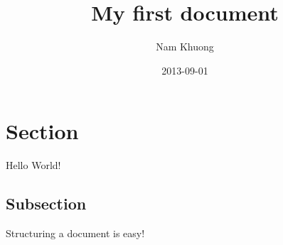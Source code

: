 \documentclass{article}
\title{My first document}
\date{2013-09-01}
\author{Nam Khuong}
\begin{document}
	\maketitle
	\newpage
	
	\section{Section}

	Hello World!

	\subsection{Subsection}
Structuring a document is easy!
\end{document}
